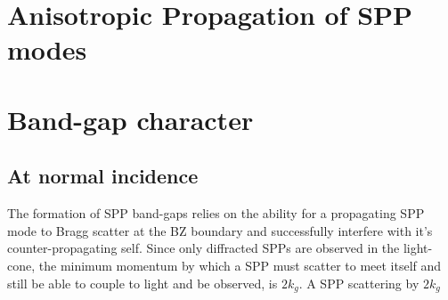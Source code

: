 \documentclass[oneside,11pt,book]{book}
\begin{document}
\section{Anisotropic Propagation of SPP modes}

\section{Band-gap character}
\subsection{At normal incidence}
The formation of SPP band-gaps relies on the ability for a propagating SPP mode to Bragg scatter at the BZ boundary and successfully interfere with it's counter-propagating self. Since only diffracted SPPs are observed in the light-cone, the minimum momentum by which a SPP must scatter to meet itself and still be able to couple to light and be observed, is $2k_g$. A SPP scattering by $2k_g$ 
\end{document}
